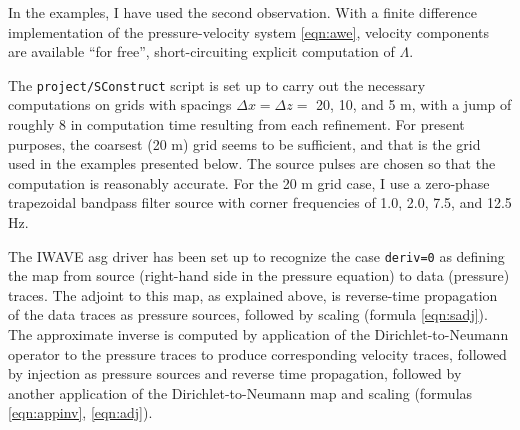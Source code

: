 In the examples, I have used the second observation. With a finite difference implementation of the pressure-velocity system \ref{eqn:awe}, velocity components are available ``for free'', short-circuiting explicit computation of $\Lambda$.

The  {\tt project/SConstruct} script is set up to carry out the necessary computations on grids with spacings $\Delta x = \Delta z = $ 20, 10, and 5 m, with a jump of roughly 8 in computation time resulting from each refinement. For present purposes, the coarsest (20 m) grid seems to be sufficient, and that is the grid used in the examples presented below. The source pulses are chosen so that the computation is reasonably accurate. For the 20 m grid case, I use a zero-phase trapezoidal bandpass filter source with corner frequencies of 1.0, 2.0, 7.5, and 12.5 Hz.

The IWAVE asg driver has been set up to recognize the case {\tt deriv=0} as defining the map from source (right-hand side in the pressure equation) to data (pressure) traces. The adjoint to this map, as explained above, is reverse-time propagation of the data traces as pressure sources, followed by scaling (formula \ref{eqn:sadj}). The approximate inverse is computed by application of the Dirichlet-to-Neumann operator to the pressure traces to produce corresponding velocity traces, followed by injection as pressure sources and reverse time propagation, followed by another application of the Dirichlet-to-Neumann map and scaling (formulas \ref{eqn:appinv}, \ref{eqn:adj}).

